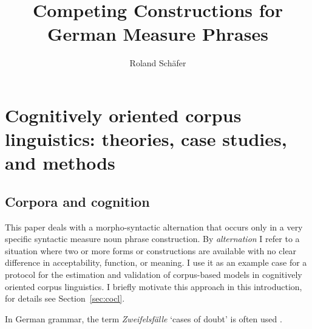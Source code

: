 \documentclass[USenglish]{article}
\begin{document}

  \author*[1]{Roland Schäfer}
  \title{Competing Constructions for German Measure Phrases}


  
\maketitle





\section{Cognitively oriented corpus linguistics: theories, case studies, and methods}
\label{sec:cogocl}

\subsection{Corpora and cognition}

This paper deals with a morpho-syntactic alternation that occurs only in a very specific syntactic measure noun phrase construction.
By \textit{alternation} I refer to a situation where two or more forms or constructions are available with no clear difference in acceptability, function, or meaning.
I use it as an example case for a protocol for the estimation and validation of corpus-based models in cognitively oriented corpus linguistics.
I briefly motivate this approach in this introduction, for details see Section~\ref{sec:cocl}.

In German grammar, the term \textit{Zweifelsfälle} `cases of doubt' is often used \citep{Klein2009}.

\end{document}
